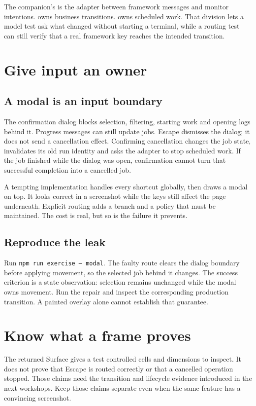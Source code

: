 The companion's  is the adapter between framework messages and monitor intentions.  owns business transitions.  owns scheduled work. That division lets a model test ask what changed without starting a terminal, while a routing test can still verify that a real framework key reaches the intended transition.

\section{Give input an owner}

\subsection{A modal is an input boundary}

The confirmation dialog blocks selection, filtering, starting work and opening logs behind it. Progress messages can still update jobs. Escape dismisses the dialog; it does not send a cancellation effect. Confirming cancellation changes the job state, invalidates its old run identity and asks the adapter to stop scheduled work. If the job finished while the dialog was open, confirmation cannot turn that successful completion into a cancelled job.

A tempting implementation handles every shortcut globally, then draws a modal on top. It looks correct in a screenshot while the keys still affect the page underneath. Explicit routing adds a branch and a policy that must be maintained. The cost is real, but so is the failure it prevents.

\subsection{Reproduce the leak}

Run \texttt{npm run exercise -- modal}. The faulty route clears the dialog boundary before applying movement, so the selected job behind it changes. The success criterion is a state observation: selection remains unchanged while the modal owns movement. Run the repair and inspect the corresponding production transition. A painted overlay alone cannot establish that guarantee.

\section{Know what a frame proves}

The returned Surface gives a test controlled cells and dimensions to inspect. It does not prove that Escape is routed correctly or that a cancelled operation stopped. Those claims need the transition and lifecycle evidence introduced in the next workshops. Keep those claims separate even when the same feature has a convincing screenshot.
